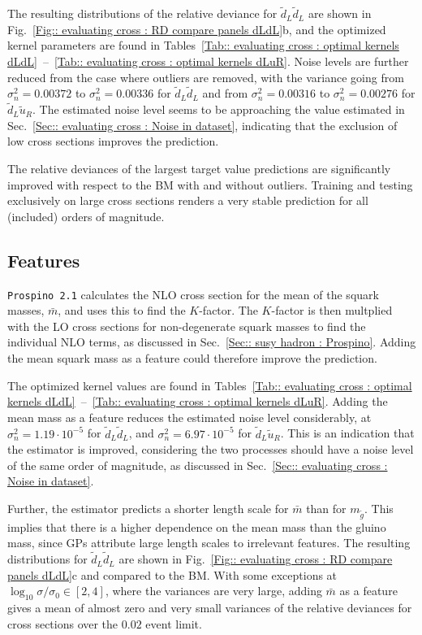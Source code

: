\documentclass[twoside,english]{uiofysmaster}
\begin{document}
{The resulting distributions of the relative deviance for $\widetilde{d}_L \widetilde{d}_L$ are shown in Fig.~\ref{Fig:: evaluating cross : RD compare panels dLdL}b, and the optimized kernel parameters are found in Tables~\ref{Tab:: evaluating cross : optimal kernels dLdL}~--~\ref{Tab:: evaluating cross : optimal kernels dLuR}. Noise levels are further reduced from the case where outliers are removed, with the variance going from $\sigma_n^2=0.00372$ to $\sigma_n^2 = 0.00336$ for $\widetilde{d}_L \widetilde{d}_L$ and from $\sigma_n^2=0.00316$ to $\sigma_n^2=0.00276$ for $\widetilde{d}_L \widetilde{u}_R$. The estimated noise level seems to be approaching the value estimated in Sec.~\ref{Sec:: evaluating cross : Noise in dataset}, indicating that the exclusion of low cross sections improves the prediction. 

The relative deviances of the largest target value predictions are significantly improved with respect to the BM with and without outliers. Training and testing exclusively on large cross sections renders a very stable prediction for all (included) orders of magnitude.

\subsection{Features}

\verb|Prospino 2.1| calculates the NLO cross section for the mean of the squark masses, $\bar{m}$, and uses this to find the $K$-factor. The $K$-factor is then multplied with the LO cross sections for non-degenerate squark masses to find the individual NLO terms, as discussed in Sec.~\ref{Sec:: susy hadron : Prospino}. Adding the mean squark mass as a feature could therefore improve the prediction. 

The optimized kernel values are found in Tables~\ref{Tab:: evaluating cross : optimal kernels dLdL}~--~\ref{Tab:: evaluating cross : optimal kernels dLuR}. Adding the mean mass as a feature reduces the estimated noise level considerably, at $\sigma_n^2 = 1.19 \cdot 10^{-5}$ for $\widetilde{d}_L \widetilde{d}_L$, and $\sigma_n^2 = 6.97 \cdot 10^{-5}$ for $\widetilde{d}_L \widetilde{u}_R$. This is an indication that the estimator is improved, considering the two processes should have a noise level of the same order of magnitude, as discussed in Sec.~\ref{Sec:: evaluating cross : Noise in dataset}. 

Further, the estimator predicts a shorter length scale for $\bar{m}$ than for $m_{\widetilde{g}}$. This implies that there is a higher dependence on the mean mass than the gluino mass, since GPs attribute large length scales to irrelevant features. The resulting distributions for $\widetilde{d}_L \widetilde{d}_L$ are shown in Fig.~\ref{Fig:: evaluating cross : RD compare panels dLdL}c and compared to the BM. With some exceptions at $\log_{10} \sigma/\sigma_0 \in [2,4]$, where the variances are very large, adding $\bar{m}$ as a feature gives a mean of almost zero and very small variances of the relative deviances for cross sections over the $0.02$ event limit. 

}
\end{document}
